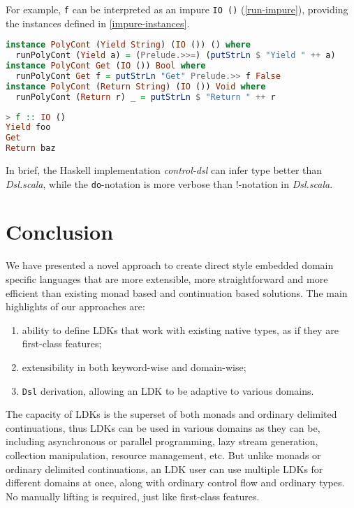 For example, \lstinline{f} can be interpreted as an impure \lstinline{IO ()} (\cref{run-impure}), providing the instances defined in \cref{impure-instances}.

\begin{lstlisting}[float=htbp,language={Haskell},caption={Custom effectful instances for built-in LDKs},label={impure-instances}]
instance PolyCont (Yield String) (IO ()) () where
  runPolyCont (Yield a) = (Prelude.>>=) (putStrLn $ "Yield " ++ a)
instance PolyCont Get (IO ()) Bool where
  runPolyCont Get f = putStrLn "Get" Prelude.>> f False
instance PolyCont (Return String) (IO ()) Void where
  runPolyCont (Return r) _ = putStrLn $ "Return " ++ r
\end{lstlisting}

\begin{lstlisting}[float=htbp,language={Haskell},caption={Running \lstinline{f} effectfuly in REPL},label={run-impure}]
> f :: IO ()
Yield foo
Get
Return baz
\end{lstlisting}

In brief, the Haskell implementation \textit{control-dsl} can infer type better than \textit{Dsl.scala}, while the \lstinline{do}-notation is more verbose than !-notation in \textit{Dsl.scala}.

\section{Conclusion}

We have presented a novel approach to create direct style embedded domain specific languages that are more extensible, more straightforward and more efficient than existing monad based and continuation based solutions. The main highlights of our approaches are:

\begin{enumerate}
  \item ability to define LDKs that work with existing native types, as if they are first-class features;
  \item extensibility in both keyword-wise and domain-wise;
  \item \lstinline{Dsl} derivation, allowing an LDK to be adaptive to various domains.
\end{enumerate}

The capacity of LDKs is the superset of both monads and ordinary delimited continuations, thus LDKs can be used in various domains as they can be, including asynchronous or parallel programming, lazy stream generation, collection manipulation, resource management, etc. But unlike monads or ordinary delimited continuations, an LDK user can use multiple LDKs for different domains at once, along with ordinary control flow and ordinary types. No manually lifting is required, just like first-class features.

